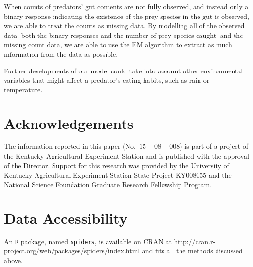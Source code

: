 \documentclass[12pt]{article}
\begin{document}
When counts of predators' gut contents are not fully observed, and instead only a binary response indicating the existence of the prey species in the gut is observed, we are able to treat the counts as missing data.  By modelling all of the observed data, both the binary responses and the number of prey species caught, and the missing count data, we are able to use the EM algorithm to extract as much information from the data as possible.

Further developments of our model could take into account other environmental variables that might affect a predator's eating habits, such as rain or temperature.  

\section{Acknowledgements}
\label{sec:acknowledge}

The information reported in this paper (No.\ $15-08-008$) is part of a project of the Kentucky Agricultural Experiment Station and is published with the approval of the Director.  Support for this research was provided by the University of Kentucky Agricultural Experiment Station State Project KY008055 and the National Science Foundation Graduate Research Fellowship Program.

\section{Data Accessibility}
\label{sec:accessibility}

An \texttt{R} package, named \texttt{spiders}, is available on CRAN at \url{http://cran.r-project.org/web/packages/spiders/index.html} and fits all the methods discussed above.  \nocite{Wickham:2011a,Wickham:2011,Bischl:2014}



\end{document}
